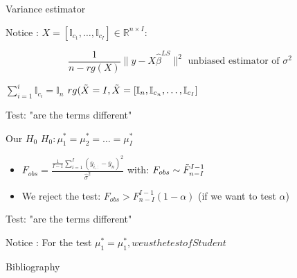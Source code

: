 \documentclass[unknownkeysallowed]{beamer}
\begin{document}
\begin{frame}{Variance estimator}
\begin{alertblock}{Notice : }
$X=[\mathbb{I}_{c_1},\dots,\mathbb{I}_{c_I}]\in \mathbb{R}^{n\times I}$: 

\[\frac{1}{n-rg(X)} \|y-X\hat{\beta}^{LS}\|^2 \text{ unbiased estimator of } \sigma^2\]

$\sum\limits_{i=1}^{i}\mathbb{I}_{c_i}=\mathbb{I}_n$
$rg(\Tilde{X}=I,\Tilde{X}=[\mathbb{I}_n,\mathbb{I}_{c_n},\dots,\mathbb{I}_{c_I}]$
\end{alertblock}
\end{frame}

\begin{frame}{Test: "are the terms different"}
\begin{alertblock}{Our $H_0$}
$H_0:\mu_{1}^{*}=\mu_{2}^{*}=\dots=\mu_{I}^{*}$
\end{alertblock}
\begin{itemize}
    \item $F_{obs}=\frac{\frac{1}{I-1}\sum\limits_{i=1}^{I}(\bar{y}_{i,:}-\bar{y}_n)^2}{\hat{\sigma}^2}$ with: $F_{obs}\sim\Tilde{F}^{I-1}_{n-I}$
    \item We reject the test: $F_{obs}>F^{I-1}_{n-I}(1-\alpha)$ (if we want to test $\alpha$)
\end{itemize}

\end{frame}

\begin{frame}{Test: "are the terms different"}
\begin{alertblock}{Notice : }
For the test $\mu^{*}_{1}=\mu^{*}_{1}, we us the test of Student$
\end{alertblock}
\end{frame}


\begin{frame}{Bibliography}
\nocite{*}
\printbibliography
\end{frame}
\end{document}
